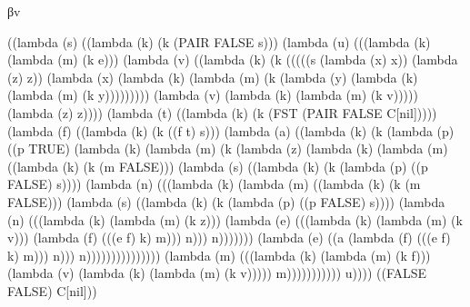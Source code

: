 \documentclass[ms,electronic,twosidetoc,letterpaper,chaptercenter,parttop]{byumsphd}
\begin{document}
\begin{theorem}
βv
\begin{schemedisplay}
((lambda (s) ((lambda (k) (k (PAIR FALSE s)))
        (lambda (u) (((lambda (k) (lambda (m) (k e)))
                (lambda (v) ((lambda (k) (k (((((s (lambda (x) x)) (lambda (z) z))
                                   (lambda (x) (lambda (k) (lambda (m) (k (lambda (y) (lambda (k) (lambda (m) (k y)))))))))
                                  (lambda (v) (lambda (k) (lambda (m) (k v))))) (lambda (z) z))))
                       (lambda (t) ((lambda (k) (k (FST
                                        (PAIR FALSE C[nil]))))
                              (lambda (f) ((lambda (k) (k ((f t) s)))
                                     (lambda (a) ((lambda (k) (k (lambda (p) ((p TRUE)
                                                            (lambda (k) (lambda (m) (k (lambda (z) (lambda (k) (lambda (m) ((lambda (k) (k (m FALSE)))
                                                                                              (lambda (s) ((lambda (k) (k (lambda (p) ((p FALSE) s))))
                                                                                                     (lambda (n) (((lambda (k) (lambda (m) ((lambda (k) (k (m FALSE)))
                                                                                                                          (lambda (s) ((lambda (k) (k (lambda (p) ((p FALSE) s))))
                                                                                                                                 (lambda (n) (((lambda (k) (lambda (m) (k z)))
                                                                                                                                         (lambda (e) (((lambda (k) (lambda (m) (k v)))
                                                                                                                                                 (lambda (f) (((e f) k) m))) n))) n)))))))
                                                                                                             (lambda (e) ((a (lambda (f) (((e f) k) m))) n))) n)))))))))))))))
                                            (lambda (m) (((lambda (k) (lambda (m) (k f)))
                                                    (lambda (v) (lambda (k) (lambda (m) (k v))))) m))))))))))) u))))
 ((FALSE
   FALSE)
  C[nil]))
\end{schemedisplay}


\end{theorem}
\end{document}
